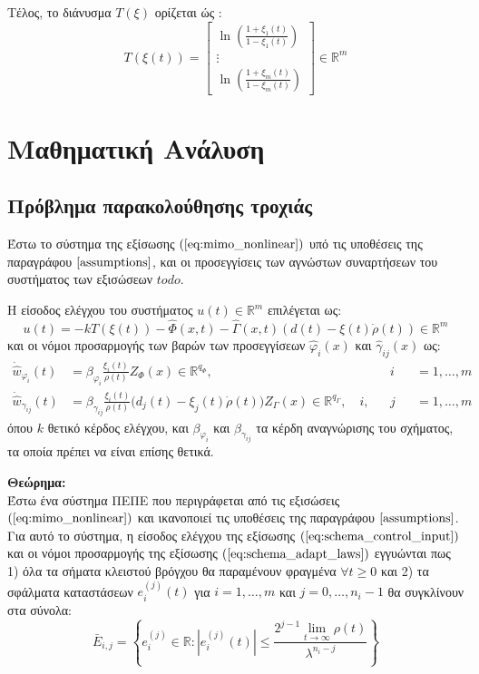Τέλος, το διάνυσμα $T(\xi)$ ορίζεται ώς :
\begin{equation*}
	T(\xi(t)) = \begin{bmatrix}
	\ln \left( \frac{1 + \xi_1(t)}{1 - \xi_1(t)} \right) \\
	\vdots \\
	\ln \left( \frac{1 + \xi_m(t)}{1 - \xi_m(t)} \right)
	\end{bmatrix}
	\in \mathbb{R}^m
\end{equation*}


\section{Μαθηματική Ανάλυση}
\subsection{Πρόβλημα παρακολούθησης τροχιάς}
Έστω το σύστημα της εξίσωσης $(\ref{eq:mimo_nonlinear})$ υπό τις υποθέσεις της παραγράφου $\ref{assumptions}$, και οι προσεγγίσεις των αγνώστων συναρτήσεων του συστήματος των εξισώσεων $todo$.

Η είσοδος ελέγχου του συστήματος $u(t) \in \mathbb{R}^m$ επιλέγεται ως:
\begin{equation}
	u(t) = -k T(\xi(t)) - \hat{\Phi}(x,t) 
	     - \hat{\Gamma}(x,t) \left( d(t) - \xi(t) \dot{\rho}(t) \right)
	     \in \mathbb{R}^m
	\label{eq:schema_control_input}
\end{equation}
και οι νόμοι προσαρμογής των βαρών των προσεγγίσεων $\hat{\varphi}_i(x)$ και $\hat{\gamma}_{ij}(x)$ ως:
\begin{equation}
\begin{alignedat}{3}
	\dot{\hat{w}}_{\varphi_i}(t) &= 
	\beta_{\varphi_i} \frac{\xi_i(t)}{\rho(t)} Z_{\Phi}(x) 
	\in \mathbb{R}^{q_{\Phi}}, \quad &&i &&= 1,\dots,m \\
	\dot{\hat{w}}_{\gamma_{ij}}(t) &= \beta_{\gamma_{ij}} \frac{\xi_i(t)}{\rho(t)}
	\big( d_j(t) - \xi_j(t) \dot{\rho}(t) \big) Z_{\Gamma}(x)
	\in \mathbb{R}^{q_{\Gamma}},
	\quad i,&&j &&= 1,\dots,m
\end{alignedat}
\label{eq:schema_adapt_laws}
\end{equation}
όπου $k$ θετικό κέρδος ελέγχου, και $\beta_{\varphi_i}$ και $\beta_{\gamma_{ij}}$ τα κέρδη αναγνώρισης του σχήματος, τα οποία πρέπει να είναι επίσης θετικά.


\textbf{Θεώρημα:}\\
Έστω ένα σύστημα ΠΕΠΕ που περιγράφεται από τις εξισώσεις $(\ref{eq:mimo_nonlinear})$ και ικανοποιεί τις υποθέσεις της παραγράφου $\ref{assumptions}$. Για αυτό το σύστημα, η είσοδος ελέγχου της εξίσωσης $(\ref{eq:schema_control_input})$ και οι νόμοι προσαρμογής της εξίσωσης $(\ref{eq:schema_adapt_laws})$ εγγυώνται πως 1) όλα τα σήματα κλειστού βρόγχου θα παραμένουν φραγμένα $\forall t\geq 0$ και 2) τα σφάλματα καταστάσεων $e_i^{(j)}(t)$ για $i=1,\dots,m$ και $j = 0,\dots,n_i-1$ θα συγκλίνουν στα σύνολα:
\begin{equation}
\bar{E}_{i,j} = \left\{ e_i^{(j)} \in \mathbb{R} :
| e_i^{(j)}(t) | \leq
\frac{ 2^{j-1} \lim\limits_{t \rightarrow \infty}\rho(t)}{\lambda^{n_i - j}} \right\}
\label{eq:final_state_error_sets}
\end{equation}

